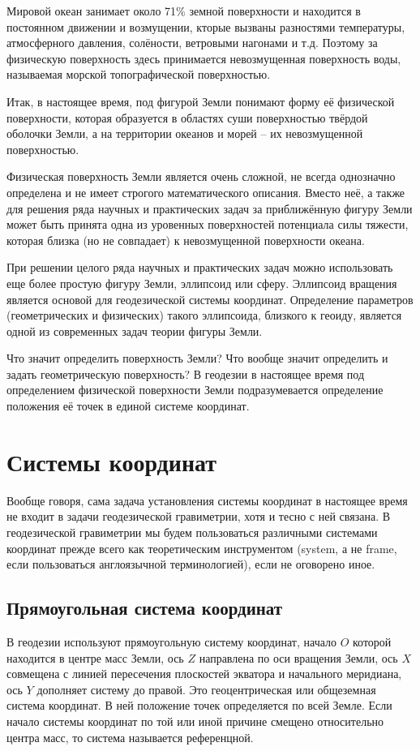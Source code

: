 \documentclass[11pt, a4paper]{article}
\theoremstyle{plain}
\theoremstyle{definition}
\theoremstyle{remark}
\begin{document}
Мировой океан занимает около 71\% земной поверхности и находится в постоянном движении и
возмущении, кторые вызваны разностями температуры, атмосферного давления, солёности,
ветровыми нагонами и т.д. Поэтому за физическую поверхность здесь принимается невозмущенная поверхность
воды, называемая морской топографической поверхностью. 

Итак, в настоящее время, под фигурой Земли понимают форму её физической поверхности, которая
образуется в областях суши поверхностью твёрдой оболочки Земли, а на территории океанов и
морей -- их невозмущенной поверхностью. 

Физическая поверхность Земли является очень сложной, не всегда однозначно определена и не имеет 
строгого математического описания.
Вместо неё, а также для решения ряда научных и практических задач за приближённую фигуру 
Земли может быть принята одна из уровенных поверхностей потенциала силы тяжести, которая близка (но не совпадает)
к невозмущенной поверхности океана.

При решении целого ряда научных и практических задач можно использовать еще более простую фигуру
Земли, эллипсоид или сферу. Эллипсоид вращения является основой для геодезической системы координат. 
Определение параметров (геометрических и физических) такого эллипсоида, близкого к геоиду, является одной из
современных задач теории фигуры Земли.

Что значит определить поверхность Земли? Что вообще значит определить и задать геометрическую
поверхность? В геодезии в настоящее время под определением физической поверхности Земли подразумевается 
определение положения её точек в единой системе координат. 

\section{Системы координат}

Вообще говоря, сама задача установления системы координат в настоящее время не входит в задачи
геодезической гравиметрии, хотя и тесно с ней связана. В геодезической гравиметрии мы будем
пользоваться различными системами координат прежде всего как теоретическим инструментом (system, а
не frame, если пользоваться англоязычной терминологией), если не оговорено иное.

\subsection{Прямоугольная система координат}
В геодезии используют прямоугольную систему координат, начало $O$ которой находится в центре масс
Земли, ось $Z$ направлена по оси вращения Земли, ось $X$ совмещена с линией пересечения плоскостей
экватора и начального меридиана, ось $Y$ дополняет систему до правой\cite{Ogorodova2006}. 
Это геоцентрическая или общеземная система координат. В ней положение точек определяется по всей
Земле. Если начало системы координат по той или иной причине смещено относительно центра масс, то
система называется референцной.
\end{document}
